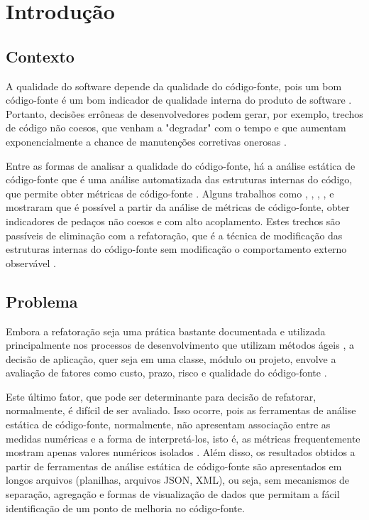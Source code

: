 \chapter{Introdução}


\section {Contexto}
A qualidade do software depende da qualidade do código-fonte, pois um bom código-fonte é um bom indicador de qualidade interna do produto de software \cite{beck2003test} \cite{ISO25023}. Portanto, decisões errôneas de desenvolvedores podem gerar, por exemplo, trechos de código não coesos, que venham a "degradar" com o tempo e que aumentam exponencialmente a chance de manutenções corretivas onerosas \cite{beck2007implementation} \cite{beck1999}.


Entre as formas de analisar a qualidade do código-fonte, há a análise estática de código-fonte que é uma análise automatizada das estruturas internas do código, que permite obter métricas de código-fonte \cite{Emanuelsson2008} \cite{Wichmann95}  \cite{Nielson:1999} \cite{Sommerville10}. Alguns trabalhos como , , , ,  e  mostraram que é possível a partir da análise de métricas de código-fonte, obter indicadores de pedaços não coesos e com alto acoplamento. Estes trechos são passíveis de eliminação com a refatoração, que é a técnica de modificação das estruturas internas do código-fonte sem modificação o comportamento externo observável \cite{fowler1999refactoring}.


\section{Problema}


Embora a refatoração seja uma prática bastante documentada e utilizada principalmente nos processos de desenvolvimento que utilizam métodos ágeis \cite{beck1999}, a decisão de aplicação, quer seja em uma classe, módulo ou projeto, envolve a avaliação de fatores como custo, prazo, risco e qualidade do código-fonte \cite{yamashita2013assessing}.  

Este último fator, que pode ser determinante para decisão de refatorar, normalmente, é difícil de ser avaliado. Isso ocorre, pois as ferramentas de análise estática de código-fonte, normalmente, não apresentam associação entre as medidas numéricas e a forma de interpretá-los, isto é, as métricas frequentemente mostram apenas valores numéricos isolados \cite{Meirelles2013}. Além disso, os resultados obtidos a partir de ferramentas de análise estática de código-fonte são apresentados em longos arquivos (planilhas, arquivos JSON, XML), ou seja, sem mecanismos de separação, agregação e formas de visualização de dados que permitam a fácil identificação de um ponto de melhoria no código-fonte.



